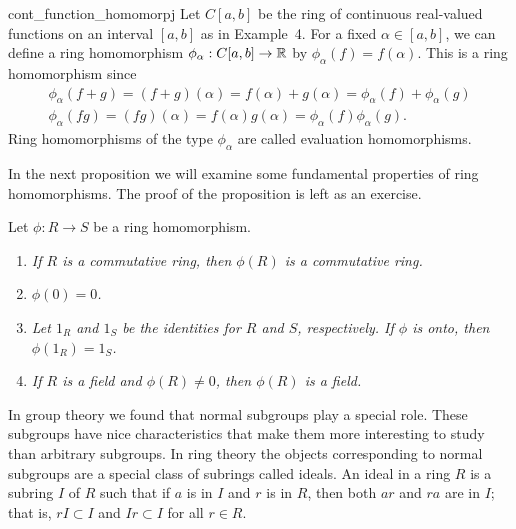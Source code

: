  
\begin{example}{cont_function_homomorpj}
Let $C[a, b]$ be the ring of continuous real-valued functions on an
interval $[a,b]$ as in Example~4. For a fixed  $\alpha \in [a, b]$,
we can define a ring homomorphism $\phi_{\alpha} : C[a, b] \rightarrow
{\Bbb R}$ by $\phi_{\alpha} (f ) = f( \alpha)$. This  is a ring
homomorphism since 
\[
\begin{array}{c}
\phi_{\alpha}( f + g )  = (f + g)( \alpha) = f(\alpha) + g(\alpha) =
\phi_{\alpha}( f ) + \phi_{\alpha}(g ) \\
\phi_{\alpha}( f  g )  = (f  g)( \alpha) = f(\alpha)  g(\alpha) =
\phi_{\alpha}( f )  \phi_{\alpha}(g ).
\end{array}
\]
Ring homomorphisms of the type $\phi_{\alpha}$ are called {\bfi
evaluation homomorphisms}.
\end{example}
 
 

 
 
In the next proposition we will examine some fundamental properties
of ring homomorphisms. The proof of the proposition is left as an
exercise.
 
 
\begin{proposition}
Let $\phi : R \rightarrow S$ be a ring homomorphism.
\begin{enumerate}
 
\rm \item \it
If $R$ is a commutative ring, then $\phi(R)$ is a
commutative ring. 
 
\rm \item \it
$\phi( 0 ) = 0$. 
 
\rm \item \it
Let $1_R$ and $1_S$ be the identities for $R$ and $S$, respectively.
If $\phi$ is onto, then $\phi(1_R) = 1_S$.  
 
\rm \item \it
If $R$ is a field and $\phi(R) \neq 0$, then $\phi(R)$ is a field.
 
\end{enumerate}
\end{proposition}
 
 
In group theory we found that normal subgroups play a special role.
These subgroups have nice characteristics that make them more
interesting to study than arbitrary subgroups.  In ring theory the
objects corresponding to normal subgroups are a special class of
subrings called ideals. An {\bfi ideal\/}
in a ring $R$ is a subring $I$ of $R$ such that if $a$ is in $I$ and
$r$ is in $R$, then both $ar$ and $ra$ are in $I$; that is, $rI
\subset I$ and $Ir \subset I$ for all $r \in R$.  
 
